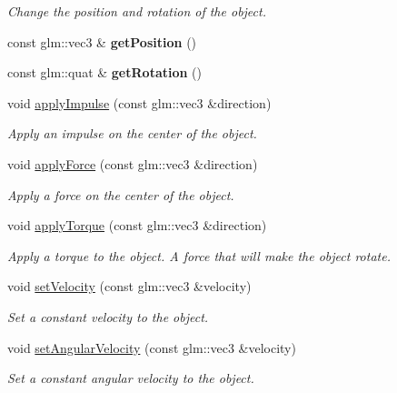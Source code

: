 \begin{DoxyCompactItemize}
\begin{DoxyCompactList}\small\item\em Change the position and rotation of the object. \end{DoxyCompactList}\item 
\mbox{\label{classTarbora_1_1RigidBody_adcaae2853b343b788c253e0b4ba79be3}} 
const glm\+::vec3 \& {\bfseries get\+Position} ()
\item 
\mbox{\label{classTarbora_1_1RigidBody_ab1a71add64c48d6566ea28e0f2a6c8ea}} 
const glm\+::quat \& {\bfseries get\+Rotation} ()
\item 
void \hyperlink{classTarbora_1_1RigidBody_a814a768747705b5a0c8fc81fca1ab1bc}{apply\+Impulse} (const glm\+::vec3 \&direction)
\begin{DoxyCompactList}\small\item\em Apply an impulse on the center of the object. \end{DoxyCompactList}\item 
void \hyperlink{classTarbora_1_1RigidBody_afb1e923b3c9d499af761f51405b6bce2}{apply\+Force} (const glm\+::vec3 \&direction)
\begin{DoxyCompactList}\small\item\em Apply a force on the center of the object. \end{DoxyCompactList}\item 
void \hyperlink{classTarbora_1_1RigidBody_ab1f757870850021535f28674bce9eb20}{apply\+Torque} (const glm\+::vec3 \&direction)
\begin{DoxyCompactList}\small\item\em Apply a torque to the object. A force that will make the object rotate. \end{DoxyCompactList}\item 
void \hyperlink{classTarbora_1_1RigidBody_aa7191b36165f8c612630ad9ba05707a6}{set\+Velocity} (const glm\+::vec3 \&velocity)
\begin{DoxyCompactList}\small\item\em Set a constant velocity to the object. \end{DoxyCompactList}\item 
void \hyperlink{classTarbora_1_1RigidBody_a895d8b8c01ee5c813d7f9d9df5dc08cd}{set\+Angular\+Velocity} (const glm\+::vec3 \&velocity)
\begin{DoxyCompactList}\small\item\em Set a constant angular velocity to the object. \end{DoxyCompactList}\item 

\end{DoxyCompactItemize}
